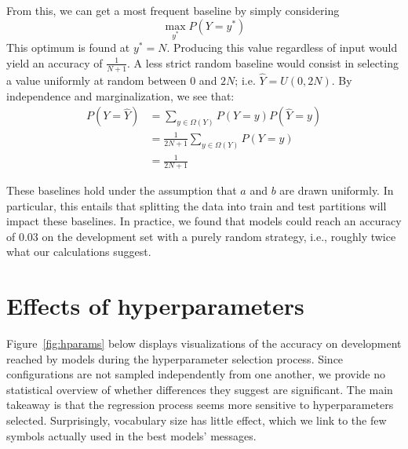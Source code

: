 \documentclass[twocolumn]{article}
\begin{document}
From this, we can get a most frequent baseline by simply considering
\begin{equation*}
    \max_{y^*} P(Y=y^*)
\end{equation*}
This optimum is found at $y^*=N$. 
Producing this value regardless of input would yield an accuracy of $\frac{1}{N+1}$.
%
A less strict random baseline would consist in selecting a value uniformly at random between 0 and $2N$; i.e. $\hat{Y} =  U(0, 2N)$.
By independence and marginalization, we see that:
\begin{align*}
    P(Y=\hat{Y})    &= \sum_{y \in \Omega(Y)} P(Y=y)P(\hat{Y}=y) \\
                    &= \frac{1}{2N+1} \sum_{y \in \Omega(Y)} P(Y=y) \\
                    &= \frac{1}{2N+1}
\end{align*}

These baselines hold under the assumption that $a$ and $b$ are drawn uniformly.
In particular, this entails that splitting the data into train and test partitions will impact these baselines.
In practice, we found that models could reach an accuracy of $0.03$ on the development set with a purely random strategy, i.e., roughly twice what our calculations suggest.

\section{Effects of hyperparameters}

Figure~\ref{fig:hparams} below displays visualizations of the accuracy on development reached by models during the hyperparameter selection process. 
Since configurations are not sampled independently from one another, we provide no statistical overview of whether differences they suggest are significant.
The main takeaway is that the regression process seems more sensitive to hyperparameters selected.
Surprisingly, vocabulary size has little effect, which we link to the few symbols actually used in the best models' messages.
\end{document}
